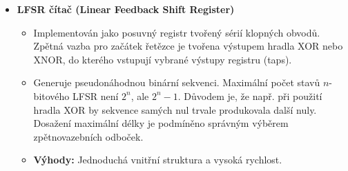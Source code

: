 \begin{itemize}
            \item \textbf{LFSR čítač (Linear Feedback Shift Register)}
            \begin{itemize}
                \item Implementován jako posuvný registr tvořený sérií klopných obvodů. Zpětná vazba pro začátek řetězce je tvořena výstupem hradla XOR nebo XNOR, do kterého vstupují vybrané výstupy registru (taps).
                \item Generuje pseudonáhodnou binární sekvenci. Maximální počet stavů $n$-bitového LFSR není $2^n$, ale $2^n - 1$. Důvodem je, že např. při použití hradla XOR by sekvence samých nul trvale produkovala další nuly. Dosažení maximální délky je podmíněno správným výběrem zpětnovazebních odboček.
                \item \textbf{Výhody:} Jednoduchá vnitřní struktura a vysoká rychlost.
            \end{itemize}
        \end{itemize}